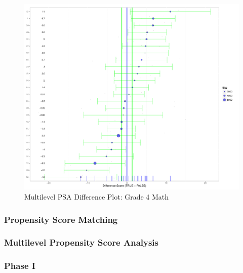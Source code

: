 \documentclass[letterpaper,12p,twoside]{article} %
\begin{document}
{\begin{figure}[ht]
\begin{center}
\includegraphics[width=\textwidth]{../Figures2009/g4math-mlpsa-ctree-diff.pdf}
\caption{Multilevel PSA Difference Plot: Grade 4 Math}
\label{fig:g4math-mlpsa-ctree-diff}
\end{center}
\end{figure}


%
%
%

%


\clearpage
\subsubsection{Propensity Score Matching}

%


\subsubsection{Multilevel Propensity Score Analysis}

\subsubsection{Phase I}

}
\end{document}
